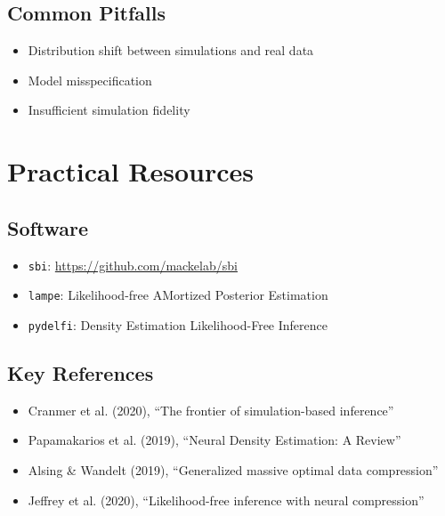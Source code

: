 \documentclass[11pt,a4paper]{article}
\theoremstyle{definition}
\begin{document}
\subsection{Common Pitfalls}
\begin{itemize}
    \item Distribution shift between simulations and real data
    \item Model misspecification
    \item Insufficient simulation fidelity
\end{itemize}

\section{Practical Resources}

\subsection{Software}
\begin{itemize}
    \item \texttt{sbi}: \url{https://github.com/mackelab/sbi}
    \item \texttt{lampe}: Likelihood-free AMortized Posterior Estimation
    \item \texttt{pydelfi}: Density Estimation Likelihood-Free Inference
\end{itemize}

\subsection{Key References}
\begin{itemize}
    \item Cranmer et al. (2020), ``The frontier of simulation-based inference''
    \item Papamakarios et al. (2019), ``Neural Density Estimation: A Review''
    \item Alsing \& Wandelt (2019), ``Generalized massive optimal data compression''
    \item Jeffrey et al. (2020), ``Likelihood-free inference with neural compression''
\end{itemize}
\end{document}
